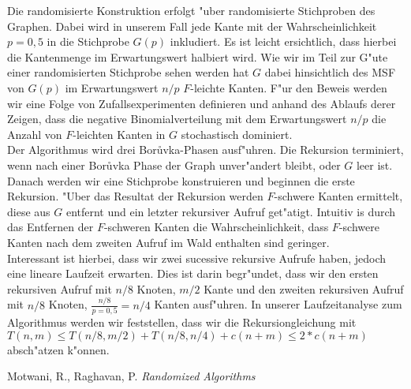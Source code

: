 \documentclass[a4paper,12pt,times,german]{cls/summary}
\begin{document}
Die randomisierte Konstruktion erfolgt "uber randomisierte Stichproben 
    des Graphen.
    Dabei wird in unserem Fall jede Kante mit der Wahrscheinlichkeit $p=0,5$
    in die Stichprobe $G(p)$ inkludiert. 
    Es ist leicht ersichtlich, dass hierbei die Kantenmenge im Erwartungswert
    halbiert wird.
    Wie wir im Teil zur G"ute einer randomisierten Stichprobe sehen werden 
    hat $G$ dabei hinsichtlich des MSF von $G(p)$ im Erwartungswert $n/p$
    $F$-leichte Kanten. 
    F"ur den Beweis werden wir eine Folge von Zufallsexperimenten definieren
    und anhand des Ablaufs derer Zeigen, dass die negative Binomialverteilung
    mit dem Erwartungswert $n/p$ die Anzahl von $F$-leichten Kanten in $G$
    stochastisch dominiert.\\
Der Algorithmus wird drei Bor\r uvka-Phasen ausf"uhren.
    Die Rekursion terminiert, wenn nach einer Bor\r uvka Phase der Graph 
    unver"andert bleibt, oder $G$ leer ist.
    Danach werden wir eine Stichprobe konstruieren und beginnen die erste
    Rekursion.
    "Uber das Resultat der Rekursion werden $F$-schwere Kanten ermittelt, 
    diese aus $G$ entfernt und ein letzter rekursiver Aufruf get"atigt.
    Intuitiv is durch das Entfernen der $F$-schweren Kanten die 
    Wahrscheinlichkeit, dass $F$-schwere Kanten nach dem zweiten Aufruf im 
    Wald enthalten sind geringer.\\
Interessant ist hierbei, dass wir zwei sucessive rekursive Aufrufe haben, jedoch
    eine lineare Laufzeit erwarten.
    Dies ist darin begr"undet, dass wir den ersten rekursiven Aufruf mit 
    $n/8$ Knoten, $m/2$ Kante und den zweiten rekursiven Aufruf mit $n/8$ Knoten,
    $\frac{n/8}{p=0,5} = n/4$ Kanten ausf"uhren.
    In unserer Laufzeitanalyse zum Algorithmus werden wir feststellen, dass
    wir die Rekursiongleichung mit 
    $T(n,m) \leq T(n/8,m/2) + T(n/8, n/4) + c(n+m) \leq 2*c(n+m)$
    absch"atzen k"onnen.\\

\begin{thebibliography}{}
\footnotesize
{} 
Motwani, R., Raghavan, P.
\textit{\glqq Randomized Algorithms\grqq} 
\end{thebibliography}
\end{document}
